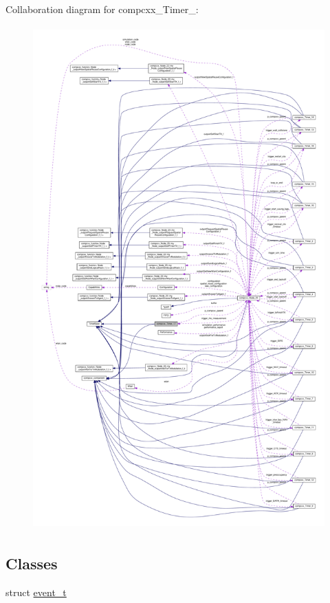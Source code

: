 Collaboration diagram for compcxx\+\_\+\+Timer\+\_\+:\nopagebreak
\begin{figure}[H]
\begin{center}
\leavevmode
\includegraphics[height=550pt]{classcompcxx__Timer__17__coll__graph}
\end{center}
\end{figure}
\subsection*{Classes}
\begin{DoxyCompactItemize}
\item 
struct \hyperlink{structcompcxx__Timer__17_1_1event__t}{event\+\_\+t}
\end{DoxyCompactItemize}

